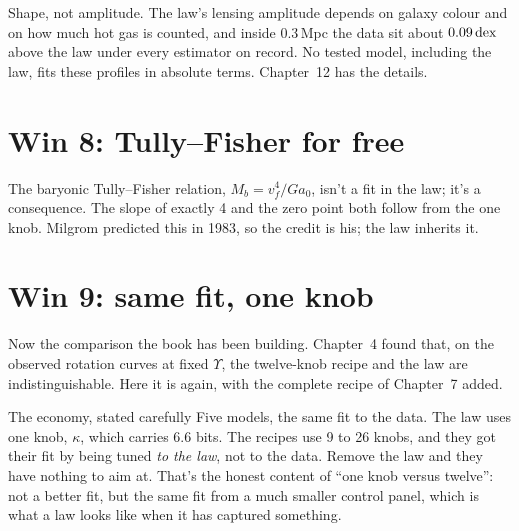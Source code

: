 
\begin{honestbox}
Shape, not amplitude. The law's lensing amplitude depends on galaxy colour and on how much hot gas is counted, and inside 0.3\,Mpc the data sit about $0.09\,\mathrm{dex}$ above the law under every estimator on record. No tested model, including the law, fits these profiles in absolute terms. Chapter~12 has the details.
\end{honestbox}

\section{Win 8: Tully--Fisher for free}

The baryonic Tully--Fisher relation, $M_b=v_f^4/Ga_0$, isn't a fit in the law; it's a consequence. The slope of exactly 4 and the zero point both follow from the one knob. Milgrom predicted this in 1983, so the credit is his; the law inherits it.


\section{Win 9: same fit, one knob}

Now the comparison the book has been building. Chapter~4 found that, on the observed rotation curves at fixed $\Upsilon$, the twelve-knob recipe and the law are indistinguishable. Here it is again, with the complete recipe of Chapter~7 added.


\begin{knobbox}{The economy, stated carefully}
Five models, the same fit to the data. The law uses one knob, $\kappa$, which carries 6.6 bits. The recipes use 9 to 26 knobs, and they got their fit by being tuned \emph{to the law}, not to the data. Remove the law and they have nothing to aim at. That's the honest content of ``one knob versus twelve'': not a better fit, but the same fit from a much smaller control panel, which is what a law looks like when it has captured something.
\end{knobbox}

